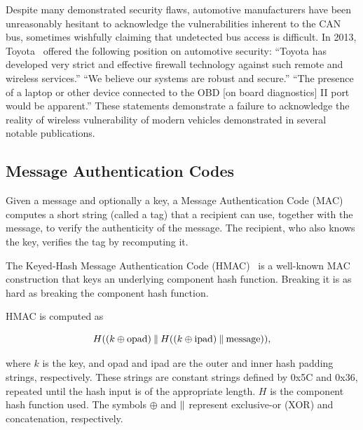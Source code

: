 Despite many demonstrated security flaws, automotive 
manufacturers have been unreasonably hesitant to acknowledge the vulnerabilities inherent to the CAN bus,
sometimes wishfully claiming that undetected bus access is difficult. 
In 2013, Toyota~\cite{?} offered the following position on automotive security: 
``Toyota has developed very strict and effective firewall technology against such remote and wireless services.'' 
``We believe our systems are robust and secure.'' 
``The presence of a laptop or other device connected to the OBD [on board diagnostics] II port would be apparent.'' 
These statements demonstrate a failure to acknowledge the 
reality of wireless vulnerability of modern vehicles demonstrated in several notable publications.

\subsection{Message Authentication Codes}

Given a message and optionally a key, a Message Authentication Code (MAC) computes a short string (called a tag) 
that a recipient can use, together with the message, to verify the authenticity of the message.  
The recipient, who also knows the key, 
verifies the tag by recomputing it.

The Keyed-Hash Message Authentication Code (HMAC)~\cite{HMAC,FIPS-198-1} 
is a well-known MAC construction that keys an underlying component hash function.  
Breaking it is as hard as breaking the component hash function.

HMAC is computed as

\begin{equation}
H((k\oplus \text{opad})\mathbin{\|} H((k\oplus \text{ipad})\mathbin{\|} \text{message})) ,
\end{equation}

\noindent
where $k$ is the key, and opad and ipad are the outer and inner hash padding strings, respectively. 
These strings are constant strings defined by 0x5C and 0x36, repeated until the hash input is of the appropriate length. 
$H$ is the component hash function used. 
The symbols $\oplus$ and $\mathbin{\|}$ represent exclusive-or (XOR) and concatenation, respectively.




